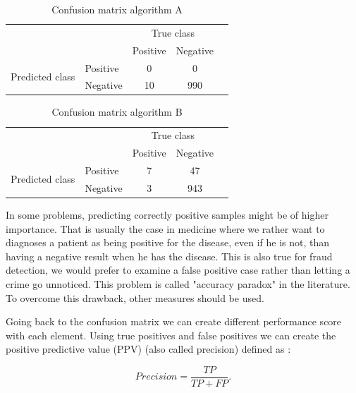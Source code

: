 \documentclass[a4paper,12pt]{article}
\numberwithin{equation}{section}
\begin{document}
\begin{table}[h]
\begin{center}
\caption{Confusion matrix algorithm A}
\begin{tabular}{l|l|c|c|c}
\multicolumn{2}{c}{}&\multicolumn{2}{c}{True class}&\\
\cline{3-4}
\multicolumn{2}{c|}{}&Positive&Negative&\\
\cline{2-4}
\multirow{2}{*}{Predicted class}& Positive & 0 & 0& \\
\cline{2-4}
& Negative & 10 & 990 &\\
\cline{2-4}
\end{tabular}
\label{table:2}
\end{center}
\end{table}

\begin{table}[h]
\begin{center}
\caption{Confusion matrix algorithm B}
\begin{tabular}{l|l|c|c|c}
\multicolumn{2}{c}{}&\multicolumn{2}{c}{True class}&\\
\cline{3-4}
\multicolumn{2}{c|}{}&Positive&Negative&\\
\cline{2-4}
\multirow{2}{*}{Predicted class}& Positive &  7 & 47& \\
\cline{2-4}
& Negative & 3 & 943 &\\
\cline{2-4}
\end{tabular}
\label{table:2}
\end{center}
\end{table}


In some problems, predicting correctly positive samples might be of higher importance. That is usually the case in medicine where we rather want to diagnoses a patient as being positive for the disease, even if he is not, than having a negative result when he has the disease. This is also true for fraud detection, we would prefer to examine a false positive case rather than letting a crime go unnoticed. This problem is called "accuracy paradox" in the literature. To overcome this drawback, other measures should be used.

Going back to the confusion matrix we can create different performance score with each element. Using true positives and false positives we can create the positive predictive value (PPV) (also called precision) defined as :

\begin{equation*}
Precision = \frac{TP}{TP + FP}.
\end{equation*} 
\end{document}
